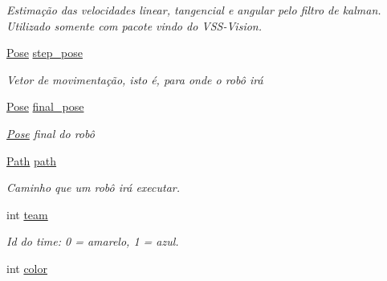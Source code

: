 \begin{DoxyCompactItemize}
\begin{DoxyCompactList}\small\item\em Estimação das velocidades linear, tangencial e angular pelo filtro de kalman. Utilizado somente com pacote vindo do V\+S\+S-\/\+Vision. \end{DoxyCompactList}\item 
\hyperlink{structcommon_1_1Pose}{Pose} \hyperlink{structcommon_1_1Robot_a5331036a164340832f703b81e834711e}{step\+\_\+pose}\hypertarget{structcommon_1_1Robot_a5331036a164340832f703b81e834711e}{}\label{structcommon_1_1Robot_a5331036a164340832f703b81e834711e}

\begin{DoxyCompactList}\small\item\em Vetor de movimentação, isto é, para onde o robô irá \end{DoxyCompactList}\item 
\hyperlink{structcommon_1_1Pose}{Pose} \hyperlink{structcommon_1_1Robot_a5b2cbd0f64426838b76365fee4f2cd7f}{final\+\_\+pose}\hypertarget{structcommon_1_1Robot_a5b2cbd0f64426838b76365fee4f2cd7f}{}\label{structcommon_1_1Robot_a5b2cbd0f64426838b76365fee4f2cd7f}

\begin{DoxyCompactList}\small\item\em \hyperlink{structcommon_1_1Pose}{Pose} final do robô \end{DoxyCompactList}\item 
\hyperlink{structcommon_1_1Path}{Path} \hyperlink{structcommon_1_1Robot_a7c07b8d76466e74162a77cb4245e7051}{path}\hypertarget{structcommon_1_1Robot_a7c07b8d76466e74162a77cb4245e7051}{}\label{structcommon_1_1Robot_a7c07b8d76466e74162a77cb4245e7051}

\begin{DoxyCompactList}\small\item\em Caminho que um robô irá executar. \end{DoxyCompactList}\item 
int \hyperlink{structcommon_1_1Robot_a4f69dbd752e60a34b7f87d779e31ae74}{team}\hypertarget{structcommon_1_1Robot_a4f69dbd752e60a34b7f87d779e31ae74}{}\label{structcommon_1_1Robot_a4f69dbd752e60a34b7f87d779e31ae74}

\begin{DoxyCompactList}\small\item\em Id do time\+: 0 = amarelo, 1 = azul. \end{DoxyCompactList}\item 
int \hyperlink{structcommon_1_1Robot_a1fc861b50fde0ea004276db69be5026d}{color}\hypertarget{structcommon_1_1Robot_a1fc861b50fde0ea004276db69be5026d}{}\label{structcommon_1_1Robot_a1fc861b50fde0ea004276db69be5026d}


\end{DoxyCompactItemize}
